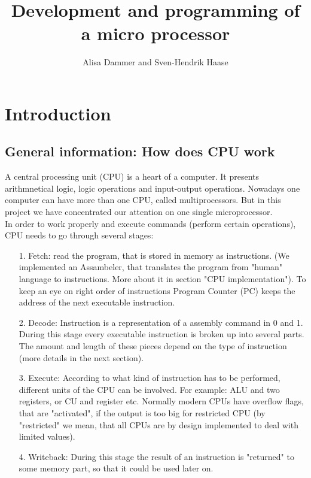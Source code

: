 \documentclass[11pt,a4paper]{article}
\begin{document}
\title{Development and programming of a micro processor}
\author{Alisa Dammer and Sven-Hendrik Haase}
\maketitle

\section{Introduction}
\subsection{General information: How does CPU work}
A central processing unit (CPU) is a heart of a computer. It presents arithmnetical logic, logic operations and input-output operations. Nowadays one computer can have more than one CPU, called multiprocessors. But in this project we have concentrated our attention on one single microprocessor.\\
In order to work properly and execute commands (perform certain operations), CPU needs to go through several stages:
\begin{enumerate}
	\item[1.] Fetch: read the program, that is stored in memory as instructions. (We implemented an Assambeler, that translates the program from "human" language to instructions. More about it in  section "CPU implementation"). To keep an eye on right order of instructions Program Counter (PC) keeps the address of the next executable instruction.
	\item[2.] Decode: Instruction is a representation of a assembly command in 0 and 1. During this stage every executable instruction is broken up into several parts. The amount and length of these pieces depend on the type of instruction (more details in the next section). 
	\item[3.] Execute: According to what kind of instruction has to be performed, different units of the CPU can be involved. For example: ALU and two registers, or CU and register etc. Normally modern CPUs have overflow flags, that are "activated", if the output is too big for restricted CPU (by "restricted" we mean, that all CPUs are by design implemented to deal with limited values).
	\item[4.] Writeback: During this stage the result of an instruction is "returned" to some memory part, so that it could be used later on.
\end{enumerate}
\end{document}

